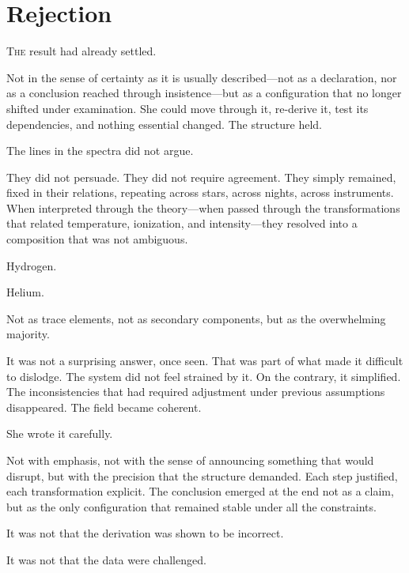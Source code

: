 
\chapter{Rejection}


\lettrine{T}{he} result had already settled.

Not in the sense of certainty as it is usually described---not as
a declaration, nor as a conclusion reached through insistence---but
as a configuration that no longer shifted under examination. She
could move through it, re-derive it, test its dependencies, and
nothing essential changed. The structure held.

The lines in the spectra did not argue.

They did not persuade. They did not require agreement. They simply
remained, fixed in their relations, repeating across stars, across
nights, across instruments. When interpreted through the
theory---when passed through the transformations that related
temperature, ionization, and intensity---they resolved into a
composition that was not ambiguous.

Hydrogen.

Helium.

Not as trace elements, not as secondary components, but as the
overwhelming majority.

It was not a surprising answer, once seen. That was part of what
made it difficult to dislodge. The system did not feel strained by
it. On the contrary, it simplified. The inconsistencies that had
required adjustment under previous assumptions disappeared. The
field became coherent.

She wrote it carefully.

Not with emphasis, not with the sense of announcing something that
would disrupt, but with the precision that the structure demanded.
Each step justified, each transformation explicit. The conclusion
emerged at the end not as a claim, but as the only configuration
that remained stable under all the constraints.

\scenebreak

It was not that the derivation was shown to be incorrect.

It was not that the data were challenged.

